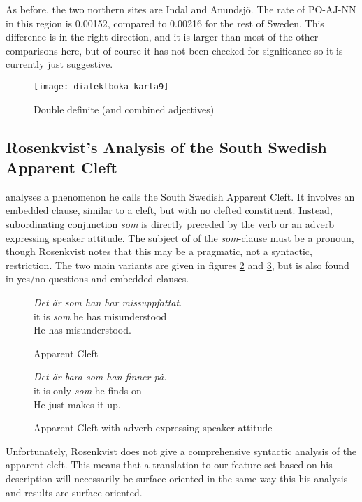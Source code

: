 As before, the two northern sites are Indal and Anundsj\"o. The rate
of PO-AJ-NN in this region is 0.00152, compared to 0.00216 for the
rest of Sweden. This difference is in the right direction, and it is
larger than most of the other comparisons here, but of course it has
not been checked for significance so it is currently just suggestive.

\begin{figure}
  \texttt{[image: dialektboka-karta9]}
  \caption{Double definite (and combined adjectives)}
  \label{double-definite-map}
\end{figure}

\subsection{Rosenkvist's Analysis of the South Swedish Apparent Cleft}

 analyses a phenomenon he calls the South
Swedish Apparent Cleft. It involves an embedded clause, similar to a
cleft, but with no clefted constituent. Instead, subordinating
conjunction {\it som} is directly preceded by the verb or an adverb
expressing speaker attitude. The subject of of the {\it som}-clause
must be a pronoun, though Rosenkvist notes that this may be a
pragmatic, not a syntactic, restriction. The two main variants are
given in figures \ref{apparent-cleft-example1} and
\ref{apparent-cleft-example2}, but is also found in yes/no questions
and embedded clauses.

\begin{figure}
  {\it Det \"ar som han har missuppfattat.} \\
  it is {\it som} he has misunderstood \\
  He has misunderstood.
  \caption{Apparent Cleft}
  \label{apparent-cleft-example1}
\end{figure}

\begin{figure}
  {\it Det \"ar bara som han finner p\.a.} \\
  it is only {\it som} he finds-on \\
  He just makes it up.
  \caption{Apparent Cleft with adverb expressing speaker attitude}
  \label{apparent-cleft-example2}
\end{figure}

Unfortunately, Rosenkvist does not give a comprehensive syntactic
analysis of the apparent cleft. This means that a translation to our
feature set based on his description will necessarily be
surface-oriented in the same way this his analysis and results are
surface-oriented.

